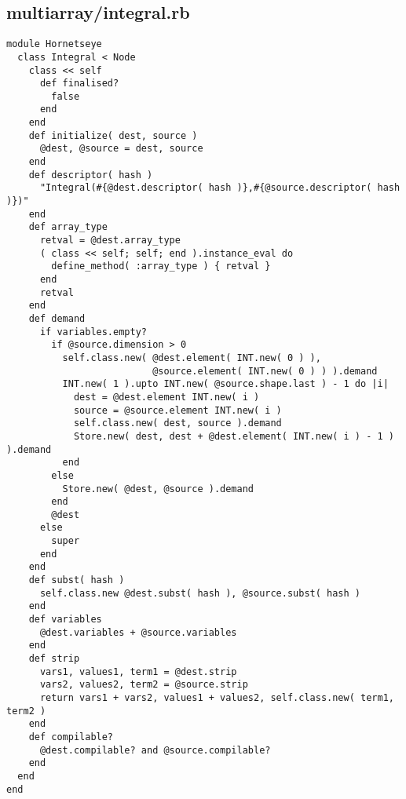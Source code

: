 \subsection{multiarray/integral.rb}\label{cha:multiarray-integral-rb}
\begin{lstlisting}
module Hornetseye
  class Integral < Node
    class << self
      def finalised?
        false
      end
    end
    def initialize( dest, source )
      @dest, @source = dest, source
    end
    def descriptor( hash )
      "Integral(#{@dest.descriptor( hash )},#{@source.descriptor( hash )})"
    end
    def array_type
      retval = @dest.array_type
      ( class << self; self; end ).instance_eval do
        define_method( :array_type ) { retval }
      end
      retval
    end
    def demand
      if variables.empty?
        if @source.dimension > 0
          self.class.new( @dest.element( INT.new( 0 ) ),
                          @source.element( INT.new( 0 ) ) ).demand
          INT.new( 1 ).upto INT.new( @source.shape.last ) - 1 do |i|
            dest = @dest.element INT.new( i )
            source = @source.element INT.new( i )
            self.class.new( dest, source ).demand
            Store.new( dest, dest + @dest.element( INT.new( i ) - 1 ) ).demand
          end
        else
          Store.new( @dest, @source ).demand
        end
        @dest
      else
        super
      end
    end
    def subst( hash )
      self.class.new @dest.subst( hash ), @source.subst( hash )
    end
    def variables
      @dest.variables + @source.variables
    end
    def strip
      vars1, values1, term1 = @dest.strip
      vars2, values2, term2 = @source.strip
      return vars1 + vars2, values1 + values2, self.class.new( term1, term2 )
    end
    def compilable?
      @dest.compilable? and @source.compilable?
    end
  end
end
\end{lstlisting}
